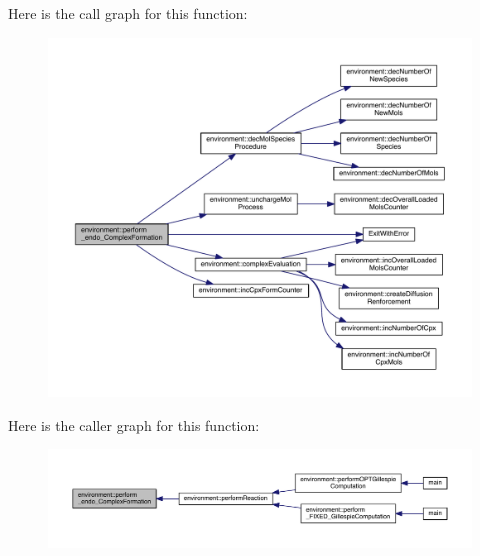 Here is the call graph for this function\+:\nopagebreak
\begin{figure}[H]
\begin{center}
\leavevmode
\includegraphics[width=350pt]{a00013_ae942db2453c56b60250a5d43452b91a5_cgraph}
\end{center}
\end{figure}




Here is the caller graph for this function\+:\nopagebreak
\begin{figure}[H]
\begin{center}
\leavevmode
\includegraphics[width=350pt]{a00013_ae942db2453c56b60250a5d43452b91a5_icgraph}
\end{center}
\end{figure}


